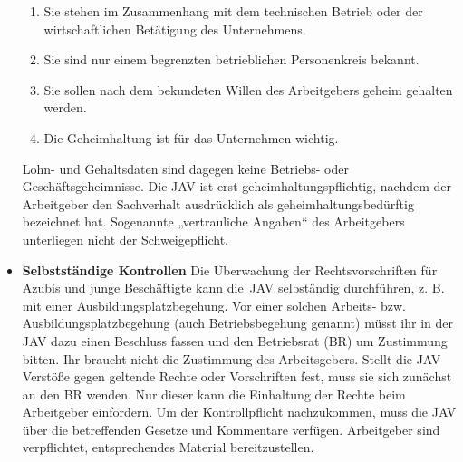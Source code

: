 \begin{itemize}
{	 }
	\begin{enumerate}
		\item 
		Sie stehen im Zusammenhang mit dem technischen Betrieb oder der wirtschaftlichen Betätigung des Unternehmens.
		\item
		Sie sind nur einem begrenzten betrieblichen Personenkreis bekannt.
		\item
		Sie sollen nach dem bekundeten Willen des Arbeitgebers geheim gehalten werden.
		\item
		Die Geheimhaltung ist für das Unternehmen wichtig.
	\end{enumerate}
	Lohn- und Gehaltsdaten sind dagegen keine Betriebs- oder Geschäftsgeheimnisse.
	\newline 
	Die JAV ist erst geheimhaltungspflichtig, nachdem der Arbeitgeber den Sachverhalt ausdrücklich als geheimhaltungsbedürftig bezeichnet hat. Sogenannte „vertrauliche Angaben“ des Arbeitgebers unterliegen nicht der Schweigepflicht.
	\item 
	\textbf{Selbstständige Kontrollen}
	{
	Die Überwachung der Rechtsvorschriften für Azubis und junge Beschäftigte kann die JAV selbständig durchführen, z. B. mit einer Ausbildungsplatzbegehung.
	\newline
	Vor einer solchen Arbeits- bzw. Ausbildungsplatzbegehung (auch Betriebsbegehung genannt) müsst ihr in der JAV dazu einen Beschluss fassen und den Betriebsrat (BR) um Zustimmung bitten. Ihr braucht nicht die Zustimmung des Arbeitsgebers.
	\newline
	Stellt die JAV Verstöße gegen geltende Rechte oder Vorschriften fest, muss sie sich zunächst an den BR wenden. Nur dieser kann die Einhaltung der Rechte beim Arbeitgeber einfordern.
	\newline
	Um der Kontrollpflicht nachzukommen, muss die JAV über die betreffenden Gesetze und Kommentare verfügen. Arbeitgeber sind verpflichtet, entsprechendes Material bereitzustellen. 
	}
\end{itemize}

